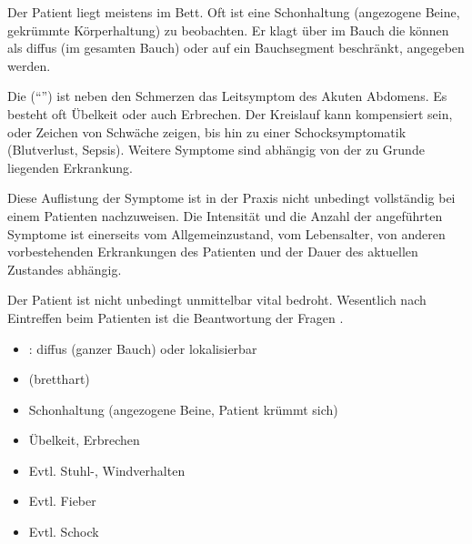 {%
Der Patient liegt meistens im Bett. Oft ist eine
Schonhaltung (angezogene Beine, gekrümmte Körperhaltung) zu
beobachten. Er klagt über  im Bauch die können
als diffus (im gesamten Bauch) oder auf ein Bauchsegment
beschränkt, angegeben werden.

Die  (\enquote{}) ist neben den
Schmerzen das Leitsymptom des Akuten Abdomens.
Es besteht oft Übelkeit oder auch Erbrechen. Der Kreislauf
kann kompensiert sein, oder Zeichen von Schwäche zeigen, bis
hin zu einer Schocksymptomatik (Blutverlust, Sepsis).
Weitere Symptome sind abhängig von der zu Grunde liegenden
Erkrankung. 

Diese Auflistung der Symptome ist in der Praxis nicht
unbedingt vollständig bei einem Patienten nachzuweisen. Die
Intensität und die Anzahl der angeführten Symptome ist
einerseits vom Allgemeinzustand, vom Lebensalter, von
anderen vorbestehenden Erkrankungen des Patienten und der
Dauer des aktuellen Zustandes abhängig.

Der Patient ist nicht unbedingt unmittelbar vital
bedroht. Wesentlich nach Eintreffen beim Patienten ist die
Beantwortung der Fragen .

} 
{
\begin{itemize}
  \item {}: diffus (ganzer Bauch) oder
  lokalisierbar
  \item {} (bretthart)
  \item Schonhaltung  (angezogene Beine, Patient
  krümmt sich)
  \item Übelkeit, Erbrechen
  \item Evtl. Stuhl-, Windverhalten
  \item Evtl. Fieber
  \item Evtl. Schock
\end{itemize}
}{}{}{}




